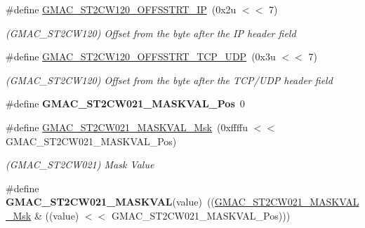 \begin{DoxyCompactItemize}
\mbox{\label{group__SAMV71__GMAC_ga27d7cfbf82bbfda6d24c96d9fa757f87}} 
\#define \mbox{\hyperlink{group__SAMV71__GMAC_ga27d7cfbf82bbfda6d24c96d9fa757f87}{G\+M\+A\+C\+\_\+\+S\+T2\+C\+W120\+\_\+\+O\+F\+F\+S\+S\+T\+R\+T\+\_\+\+IP}}~(0x2u $<$$<$ 7)
\begin{DoxyCompactList}\small\item\em (G\+M\+A\+C\+\_\+\+S\+T2\+C\+W120) Offset from the byte after the IP header field \end{DoxyCompactList}\item 
\mbox{\label{group__SAMV71__GMAC_ga8a02c594997e347dd9f9df7882c05380}} 
\#define \mbox{\hyperlink{group__SAMV71__GMAC_ga8a02c594997e347dd9f9df7882c05380}{G\+M\+A\+C\+\_\+\+S\+T2\+C\+W120\+\_\+\+O\+F\+F\+S\+S\+T\+R\+T\+\_\+\+T\+C\+P\+\_\+\+U\+DP}}~(0x3u $<$$<$ 7)
\begin{DoxyCompactList}\small\item\em (G\+M\+A\+C\+\_\+\+S\+T2\+C\+W120) Offset from the byte after the T\+C\+P/\+U\+DP header field \end{DoxyCompactList}\item 
\mbox{\label{group__SAMV71__GMAC_ga0c8b6fd17c55bc1b8ff2071e71193af0}} 
\#define {\bfseries G\+M\+A\+C\+\_\+\+S\+T2\+C\+W021\+\_\+\+M\+A\+S\+K\+V\+A\+L\+\_\+\+Pos}~0
\item 
\mbox{\label{group__SAMV71__GMAC_gaf65d51f3ea4f88c61837d37e6dd71fa8}} 
\#define \mbox{\hyperlink{group__SAMV71__GMAC_gaf65d51f3ea4f88c61837d37e6dd71fa8}{G\+M\+A\+C\+\_\+\+S\+T2\+C\+W021\+\_\+\+M\+A\+S\+K\+V\+A\+L\+\_\+\+Msk}}~(0xffffu $<$$<$ G\+M\+A\+C\+\_\+\+S\+T2\+C\+W021\+\_\+\+M\+A\+S\+K\+V\+A\+L\+\_\+\+Pos)
\begin{DoxyCompactList}\small\item\em (G\+M\+A\+C\+\_\+\+S\+T2\+C\+W021) Mask Value \end{DoxyCompactList}\item 
\mbox{\label{group__SAMV71__GMAC_ga1e59dce7fca1e6b504b0148028268a7e}} 
\#define {\bfseries G\+M\+A\+C\+\_\+\+S\+T2\+C\+W021\+\_\+\+M\+A\+S\+K\+V\+AL}(value)~((\mbox{\hyperlink{group__SAMV71__GMAC_gaf65d51f3ea4f88c61837d37e6dd71fa8}{G\+M\+A\+C\+\_\+\+S\+T2\+C\+W021\+\_\+\+M\+A\+S\+K\+V\+A\+L\+\_\+\+Msk}} \& ((value) $<$$<$ G\+M\+A\+C\+\_\+\+S\+T2\+C\+W021\+\_\+\+M\+A\+S\+K\+V\+A\+L\+\_\+\+Pos)))

\end{DoxyCompactItemize}

